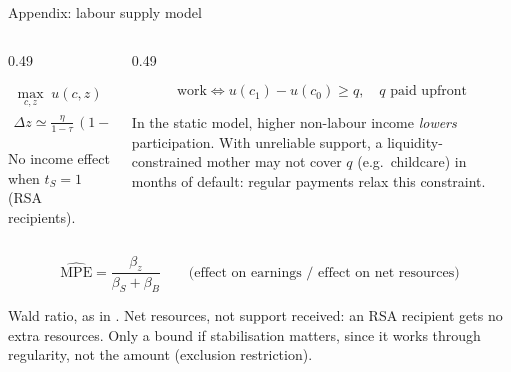 \documentclass[aspectratio=169,10pt]{beamer}
\begin{document}
\begin{frame}{Appendix: labour supply model}
\footnotesize
\begin{columns}[T,onlytextwidth]
  \begin{column}{0.49\textwidth}
    \begin{keybox}
      \vspace{-0.2cm}
      \begin{gather*}
        \max_{c,z}\; u(c,z) \quad \text{s.t.} \quad c = (1-\tau)\,z + R + (1-t_S)\,p\,S \\[0.1cm]
        \Delta z \simeq \frac{\eta}{1-\tau}\,(1-t_S)\,S\,\Delta p,
        \qquad \eta \equiv (1-\tau)\,\frac{\partial z}{\partial R} \le 0
      \end{gather*}
      \vspace{-0.35cm}

      {\scriptsize No income effect when $t_S = 1$ (RSA recipients).}
    \end{keybox}
  \end{column}
  \begin{column}{0.49\textwidth}
    \begin{keybox}
      \vspace{-0.2cm}
      \[
        \text{work} \iff u(c_1) - u(c_0) \geq q, \quad q \text{ paid upfront}
      \]
      \vspace{-0.4cm}

      {\scriptsize In the static model, higher non-labour income \emph{lowers} participation.
      With unreliable support, a liquidity-constrained mother may not cover $q$ (e.g.\ childcare)
      in months of default: regular payments relax this constraint.}
    \end{keybox}
  \end{column}
\end{columns}

\vspace{0.2cm}
\begin{keybox}
  \vspace{-0.2cm}
  \[
    \widehat{\text{MPE}} = \frac{\beta_z}{\beta_S + \beta_B}
    \qquad \text{(effect on earnings / effect on net resources)}
  \]
  \vspace{-0.1cm}

  {\scriptsize Wald ratio, as in \textcite{golosov2024}. Net resources, not support received: an RSA recipient
  gets no extra resources. Only a bound if stabilisation matters, since it works through regularity, not the amount
  (exclusion restriction).}
\end{keybox}
\end{frame}
\end{document}
